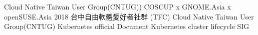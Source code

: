 %
%
%


\begin{scholarship}
					{Cloud Native Taiwan User Group(CNTUG))}
					{COSCUP x GNOME.Asia x openSUSE.Asia 2018}
					{台中自由軟體愛好者社群 (TFC)}
					{Cloud Native Taiwan User Group(CNTUG)}
					{Kubernetes official Document}
					{Kubernetes cluster lifecycle SIG}
\end{scholarship}